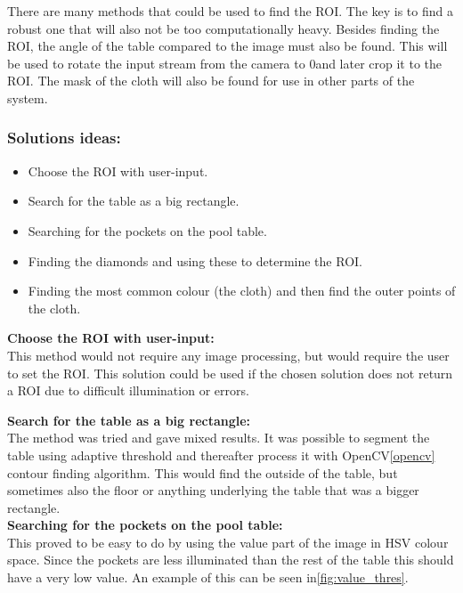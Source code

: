 There are many methods that could be used to find the ROI. The key is to find a robust one that will also not be too computationally heavy. Besides finding the ROI, the angle of the table compared to the image must also be found. This will be used to rotate the input stream from the camera to 0\degree and later crop it to the ROI. The mask of the cloth will also be found for use in other parts of the system.\\

\subsubsection{Solutions ideas:}

\begin{itemize}
\setlength{\itemsep}{0mm}
	\item Choose the ROI with user-input.
	\item Search for the table as a big rectangle.
	\item Searching for the pockets on the pool table.
	\item Finding the diamonds and using these to determine the ROI.
	\item Finding the most common colour (the cloth) and then find the outer points of the cloth.
\end{itemize}

\textbf{Choose the ROI with user-input:}\\
This method would not require any image processing, but would require the user to set the ROI. This solution could be used if the chosen solution does not return a ROI due to difficult illumination or errors.

\textbf{Search for the table as a big rectangle:}\\
The method was tried and gave mixed results. It was possible to segment the table using adaptive threshold and thereafter process it with OpenCV\ref{opencv} contour finding algorithm. This would find the outside of the table, but sometimes also the floor or anything underlying the table that was a bigger rectangle.\\

\textbf{Searching for the pockets on the pool table:}\\
This proved to be easy to do by using the value part of the image in HSV colour space. Since the pockets are less illuminated than the rest of the table this should have a very low value. An example of this can be seen in\ref{fig:value_thres}. 

